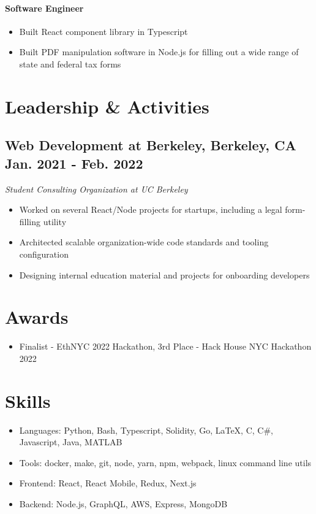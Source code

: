 \documentclass{article}
\begin{document}
	\paragraph{Software Engineer}
	\begin{itemize}
		\item Built React component library in Typescript
		\item Built PDF manipulation software in Node.js for filling out a wide range of state and federal tax forms
	\end{itemize}


	\section{Leadership \& Activities}

	\subsection{
		\textbf{Web Development at Berkeley}, Berkeley, CA
		{\hspace{\fill}\bfseries Jan. 2021 - Feb. 2022}
	}
	{\itshape Student Consulting Organization at UC Berkeley}
	\begin{itemize}
		\item Worked on several React/Node projects for startups, including a legal form-filling utility
		\item Architected scalable organization-wide code standards and tooling configuration
		\item Designing internal education material and projects for onboarding developers
	\end{itemize}

	\vspace{14pt}

	\section{Awards}
	\vspace{3pt}
	\begin{itemize}
		\item Finalist - EthNYC 2022 Hackathon, 3rd Place - Hack House NYC Hackathon 2022
	\end{itemize}

	\section{Skills}
	\vspace{3pt}
	\begin{itemize}
    \item Languages: Python, Bash, Typescript, Solidity, Go, {\latexfont \LaTeX}, C, C\#, Javascript, Java, MATLAB
		\item Tools: docker, make, git, node, yarn, npm, webpack, linux command line utils
		\item Frontend: React, React Mobile, Redux, Next.js
		\item Backend: Node.js, GraphQL, AWS, Express, MongoDB
	\end{itemize}
\end{document}
